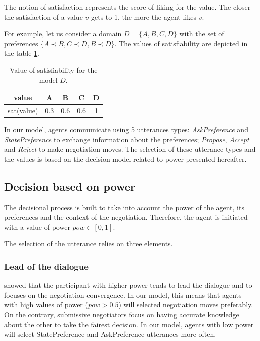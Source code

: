 \documentclass[sigconf]{aamas}  %
\begin{document}
%	
	The notion of satisfaction represents the score of liking for the value. The closer the satisfaction of a value $v$ gets to 1, the more the agent likes $v$.
	
	\par For example, let us consider a domain $D =\{A, B, C, D\}$ with the set of preferences $\{A \prec B, C \prec D , B \prec D \}$. The values of satisfiability are depicted in the table \ref{tab:sat}.
		\begin{table}
			\centering
			\begin{tabular}{ |c|c|c|c|c| }
				\hline				
				value & A & B & C & D \\
				\hline
				
				\hline
				sat(value) & 0.3 & 0.6 & 0.6 & 1 \\
				\hline
				
			\end{tabular}
			\caption{Value of satisfiability for the model $D$.}
			\label{tab:sat}
		\end{table}
	
	\par
	In our model, agents communicate using 5 utterances types: \emph{AskPreference} and \emph{StatePreference} to exchange information about the preferences; \emph{Propose}, \emph{Accept} and \emph{Reject} to make negotiation moves. The selection of these utterance types and the values is based on the decision model related to power presented hereafter.
	
	\subsection{Decision based on power}
	
	The decisional process is built to take into account the power of the agent, its preferences and the context of the negotiation. Therefore, the agent is initiated with a value of power $pow \in [0,1]$. 
	
	The selection of the utterance relies on three elements.
	
	\subsubsection{Lead of the dialogue}
	\cite{magee2007power,de2004influence} showed that the participant with higher power tends to lead the dialogue and to focuses on the negotiation convergence. In our model, this means that agents with high values of power ($pow>0.5$) will selected negotiation moves preferably. On the contrary, submissive negotiators focus on having accurate knowledge about the other to take the fairest decision. In our model, agents with low power will select StatePreference and AskPreference utterances more often.
		
\end{document}
